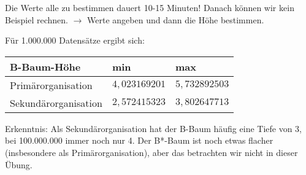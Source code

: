 \begin{solution}
\begin{note}
Die Werte alle zu bestimmen dauert 10-15 Minuten! Danach können wir kein Beispiel rechnen. $\rightarrow$ Werte angeben und dann die Höhe bestimmen.
\end{note}

Für 1.000.000 Datensätze ergibt sich:

\begin{tabular}{p{4cm} p{3cm} p{3cm}}
	B-Baum-Höhe				& min 						& max						\\
	\hline
	Primärorganisation 		& $4,023169201$	& $5,732892503$ 	\\
	\hline
	Sekundärorganisation 	& $2,572415323$	& $3,802647713$	\\
	\hline
\end{tabular}

Erkenntnis: Als Sekundärorganisation hat der B-Baum häufig eine Tiefe von 3, bei 100.000.000 immer noch nur 4.
Der B*-Baum ist noch etwas flacher (insbesondere als Primärorganisation), aber das betrachten wir nicht in dieser Übung.
\end{solution}
